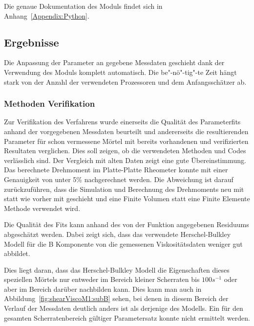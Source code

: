 Die genaue Dokumentation des  Moduls findet sich in Anhang~\ref{Appendix:Python}.
%
\subsection{Ergebnisse}
Die Anpassung der Parameter an gegebene Messdaten geschieht dank der Verwendung des  Moduls komplett automatisch. 
Die be"-nö"-tig"-te Zeit hängt stark von der Anzahl der verwendeten Prozessoren und dem Anfangsschätzer ab.
%
\subsubsection{Methoden Verifikation}
Zur Verifikation des Verfahrens wurde einerseits die Qualität des Parameterfits anhand der vorgegebenen Messdaten beurteilt und andererseits die resultierenden Parameter für schon vermessene Mörtel mit bereits vorhandenen und verifizierten Resultaten verglichen.
Dies soll zeigen, ob die verwendeten Methoden und Codes verlässlich sind.
Der Vergleich mit alten Daten zeigt eine gute Übereinstimmung. Das berechnete Drehmoment im Platte-Platte Rheometer konnte mit einer Genauigkeit von unter 5\% nachgerechnet werden. Die Abweichung ist darauf zurückzuführen, dass die Simulation und Berechnung des Drehmoments neu mit \openfoam{} statt wie vorher mit \comsol{} geschieht und eine Finite Volumen statt eine Finite Elemente Methode verwendet wird.

Die Qualität des Fits kann anhand des von der Funktion  angegebenen Residuums abgeschätzt werden. Dabei zeigt sich, dass das verwendete Herschel-Bulkley Modell für die B Komponente von \moertelA{} die gemessenen Viskositätsdaten weniger gut abbildet.

Dies liegt daran, dass das Herschel-Bulkley Modell die Eigenschaften dieses speziellen Mörtels nur entweder im Bereich kleiner Scherraten bis $100 s^{-1}$ oder aber im Bereich darüber nachbilden kann. Dies kann man auch in Abbildung~\ref{fig:shearViscoM1:subB} sehen, bei denen in diesem Bereich der Verlauf der Messdaten deutlich anders ist als derjenige des Modells. Ein für den gesamten Scherratenbereich gültiger Parametersatz konnte nicht ermittelt werden.
%
